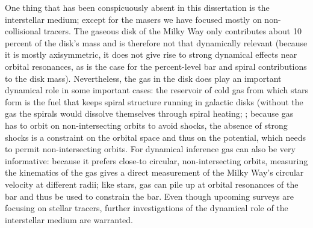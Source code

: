One thing that has been conspicuously absent in this dissertation is
the interstellar medium; except for the masers we have focused mostly
on non-collisional tracers. The gaseous disk of the Milky Way only
contributes about 10\,percent of the disk's mass and is therefore not
that dynamically relevant (because it is mostly axisymmetric, it does
not give rise to strong dynamical effects near orbital resonances, as
is the case for the percent-level bar and spiral contributions to the
disk mass). Nevertheless, the gas in the disk does play an important
dynamical role in some important cases: the reservoir of cold gas from
which stars form is the fuel that keeps spiral structure running in
galactic disks (without the gas the spirals would dissolve themselves
through spiral heating; \citealt{Carlberg85a}; because gas has to
orbit on non-intersecting orbits to avoid shocks, the absence of
strong shocks is a constraint on the orbital space and thus on the
potential, which needs to permit non-intersecting orbits. For
dynamical inference gas can also be very informative: because it
prefers close-to circular, non-intersecting orbits, measuring the
kinematics of the gas gives a direct measurement of the Milky Way's
circular velocity at different radii; like stars, gas can pile up at
orbital resonances of the bar and thus be used to constrain the
bar. Even though upcoming surveys are focusing on stellar tracers,
further investigations of the dynamical role of the interstellar
medium are warranted.
